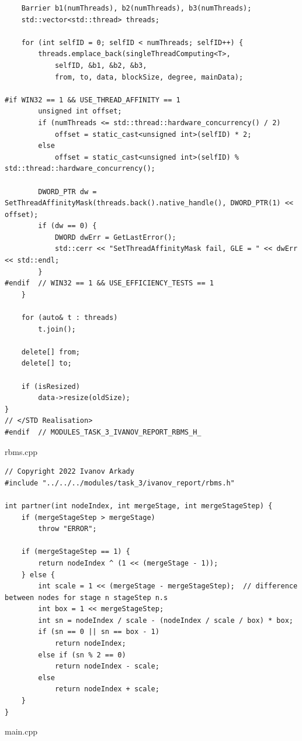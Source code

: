 \documentclass{report}
\begin{document}
\begin{lstlisting}
    Barrier b1(numThreads), b2(numThreads), b3(numThreads);
    std::vector<std::thread> threads;

    for (int selfID = 0; selfID < numThreads; selfID++) {
        threads.emplace_back(singleThreadComputing<T>,
            selfID, &b1, &b2, &b3,
            from, to, data, blockSize, degree, mainData);

#if WIN32 == 1 && USE_THREAD_AFFINITY == 1
        unsigned int offset;
        if (numThreads <= std::thread::hardware_concurrency() / 2)
            offset = static_cast<unsigned int>(selfID) * 2;
        else
            offset = static_cast<unsigned int>(selfID) % std::thread::hardware_concurrency();

        DWORD_PTR dw = SetThreadAffinityMask(threads.back().native_handle(), DWORD_PTR(1) << offset);
        if (dw == 0) {
            DWORD dwErr = GetLastError();
            std::cerr << "SetThreadAffinityMask fail, GLE = " << dwErr << std::endl;
        }
#endif  // WIN32 == 1 && USE_EFFICIENCY_TESTS == 1
    }

    for (auto& t : threads)
        t.join();

    delete[] from;
    delete[] to;

    if (isResized)
        data->resize(oldSize);
}
// </STD Realisation>
#endif  // MODULES_TASK_3_IVANOV_REPORT_RBMS_H_
\end{lstlisting}
rbms.cpp
\begin{lstlisting}
// Copyright 2022 Ivanov Arkady
#include "../../../modules/task_3/ivanov_report/rbms.h"

int partner(int nodeIndex, int mergeStage, int mergeStageStep) {
    if (mergeStageStep > mergeStage)
        throw "ERROR";

    if (mergeStageStep == 1) {
        return nodeIndex ^ (1 << (mergeStage - 1));
    } else {
        int scale = 1 << (mergeStage - mergeStageStep);  // difference between nodes for stage n stageStep n.s
        int box = 1 << mergeStageStep;
        int sn = nodeIndex / scale - (nodeIndex / scale / box) * box;
        if (sn == 0 || sn == box - 1)
            return nodeIndex;
        else if (sn % 2 == 0)
            return nodeIndex - scale;
        else
            return nodeIndex + scale;
    }
}
\end{lstlisting}
main.cpp
\end{document}
